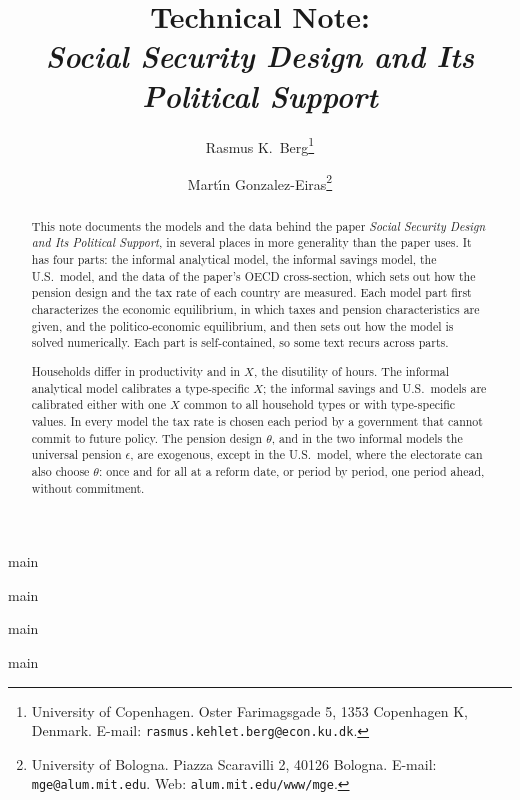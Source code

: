 \documentclass[a4paper]{article}
\begin{document}
\title{Technical Note: \\
\emph{Social Security Design and Its Political Support}}

\author{Rasmus K.\ Berg\thanks{University of Copenhagen. Oster Farimagsgade 5, 1353 Copenhagen K, Denmark. E-mail: \texttt{rasmus.kehlet.berg@econ.ku.dk}.}
\and
Mart\'{\i}n Gonzalez-Eiras\thanks{University of Bologna. Piazza Scaravilli 2, 40126 Bologna. E-mail: \texttt{mge@alum.mit.edu}. Web: \texttt{alum.mit.edu/www/mge}.}}
\maketitle

\begin{abstract}
\noindent
This note documents the models and the data behind the paper \textit{Social Security Design and Its Political Support}, in several places in more generality than the paper uses. It has four parts: the informal analytical model, the informal savings model, the U.S.\ model, and the data of the paper's OECD cross-section, which sets out how the pension design and the tax rate of each country are measured. Each model part first characterizes the economic equilibrium, in which taxes and pension characteristics are given, and the politico-economic equilibrium, and then sets out how the model is solved numerically. Each part is self-contained, so some text recurs across parts.

Households differ in productivity and in $X$, the disutility of hours. The informal analytical model calibrates a type-specific $X$; the informal savings and U.S.\ models are calibrated either with one $X$ common to all household types or with type-specific values. In every model the tax rate is chosen each period by a government that cannot commit to future policy. The pension design $\theta$, and in the two informal models the universal pension $\epsilon$, are exogenous, except in the U.S.\ model, where the electorate can also choose $\theta$: once and for all at a reform date, or period by period, one period ahead, without commitment.
\end{abstract}


\listofmodels

{main}

\resetdocumentnumbering
{main}

\resetdocumentnumbering
{main}

\resetdocumentnumbering
{main}
\end{document}
